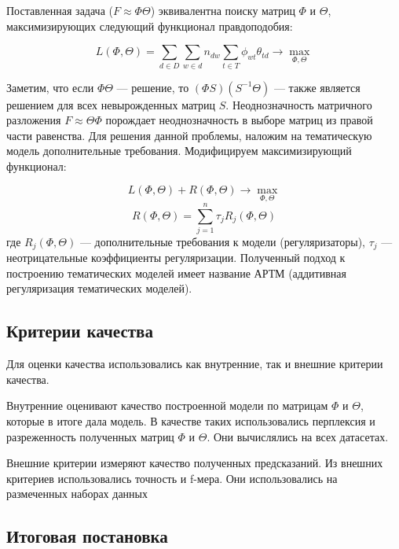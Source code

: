 \documentclass[12pt,twoside]{article}
\begin{document}
	
	Поставленная задача ($F \approx \Phi \Theta$) эквивалентна поиску матриц $\Phi$ и $\Theta$, максимизирующих следующий функционал правдоподобия:
	
	\begin{equation}\label{eq_1}
	L(\Phi, \Theta) = \sum_{d \in D} \sum_{w \in d} n_{dw} \sum_{t \in T} \phi_{wt} \theta_{td} \rightarrow \max_{\Phi, \Theta}
	\end{equation}
	
	Заметим, что если $\Phi \Theta$ --- решение, то $(\Phi S ) (S^{-1}\Theta)$ --- также является решением для всех невырожденных матриц $S$. Неоднозначность матричного разложения  $F \approx \Theta \Phi$ порождает неоднозначность в
	выборе матриц из правой части равенства. Для решения данной проблемы, наложим
	на тематическую модель дополнительные требования. Модифицируем максимизирующий функционал:
	
	\begin{equation}
	L(\Phi, \Theta) + R(\Phi, \Theta) \rightarrow \max_{\Phi, \Theta}
	\end{equation}	
	\begin{equation}	
	R(\Phi, \Theta) = \sum_{j=1}^{n} \tau_j R_j(\Phi, \Theta)
	\end{equation}
	где $R_j(\Phi, \Theta)$ --- дополнительные требования к модели (регуляризаторы),  $\tau_j$ --- неотрицательные коэффициенты регуляризации. Полученный подход к построению тематических моделей имеет название АРТМ (аддитивная регуляризация тематических моделей).
	
	\subsection{Критерии качества}
	
	Для оценки качества использовались как внутренние, так и внешние критерии качества.
	
	Внутренние оценивают качество построенной модели по матрицам $\Phi$ и $\Theta$, которые в итоге дала модель.
	В качестве таких использовались перплексия и разреженность полученных матриц $\Phi$ и $\Theta$. Они вычислялись на всех датасетах.
	
	Внешние критерии измеряют качество полученных предсказаний. Из внешних критериев использовались точность и f-мера. Они использовались на размеченных наборах данных
	
	\subsection{Итоговая постановка}
	
\end{document}
